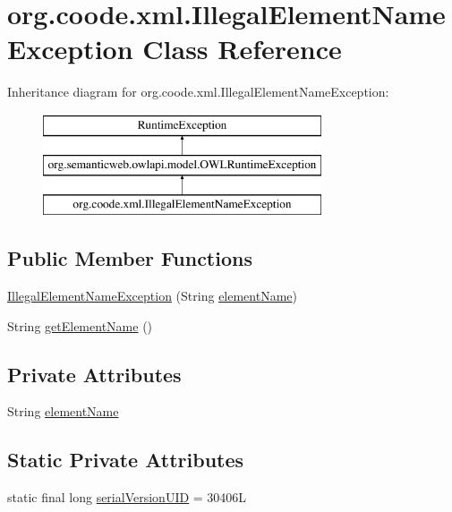 \hypertarget{classorg_1_1coode_1_1xml_1_1_illegal_element_name_exception}{\section{org.\-coode.\-xml.\-Illegal\-Element\-Name\-Exception Class Reference}
\label{classorg_1_1coode_1_1xml_1_1_illegal_element_name_exception}
}
Inheritance diagram for org.\-coode.\-xml.\-Illegal\-Element\-Name\-Exception\-:\begin{figure}[H]
\begin{center}
\leavevmode
\includegraphics[height=3.000000cm]{classorg_1_1coode_1_1xml_1_1_illegal_element_name_exception}
\end{center}
\end{figure}
\subsection*{Public Member Functions}
\begin{DoxyCompactItemize}
\item 
\hyperlink{classorg_1_1coode_1_1xml_1_1_illegal_element_name_exception_a341f9c9bce4d8534e944e42bfe5e98ca}{Illegal\-Element\-Name\-Exception} (String \hyperlink{classorg_1_1coode_1_1xml_1_1_illegal_element_name_exception_a2864fd5f4b611a538e80dbfdfaa6d930}{element\-Name})
\item 
String \hyperlink{classorg_1_1coode_1_1xml_1_1_illegal_element_name_exception_a9cf50f953e07a94342da8d866ea499ec}{get\-Element\-Name} ()
\end{DoxyCompactItemize}
\subsection*{Private Attributes}
\begin{DoxyCompactItemize}
\item 
String \hyperlink{classorg_1_1coode_1_1xml_1_1_illegal_element_name_exception_a2864fd5f4b611a538e80dbfdfaa6d930}{element\-Name}
\end{DoxyCompactItemize}
\subsection*{Static Private Attributes}
\begin{DoxyCompactItemize}
\item 
static final long \hyperlink{classorg_1_1coode_1_1xml_1_1_illegal_element_name_exception_a36225ca0e0bbc64f8f9184a3b9c89dd4}{serial\-Version\-U\-I\-D} = 30406\-L
\end{DoxyCompactItemize}


